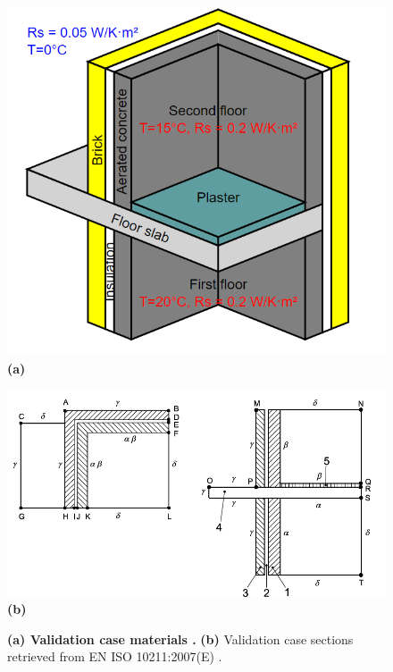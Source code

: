 \begin{figure}[h!]
    \centering
    \begin{minipage}[t]{0.54\columnwidth}
        \centering
        \includegraphics[width=\linewidth]{Figures/validationcase}
        \textbf{(a)}
    \end{minipage}
    \hfill
    \begin{minipage}[t]{0.8\linewidth}
        \centering
        \includegraphics[width=\linewidth]{Figures/isodesc.png}
        \textbf{(b)}
    \end{minipage}
    
    \caption[3D Validation Materials]{\textbf{(a) Validation case materials \cite{ISO}.} \textbf{(b)}  Validation case sections retrieved from \gls{EN} ISO 10211:2007(E) \cite{ISO}.}
    \label{fig:validation-case-materials}
\end{figure}









